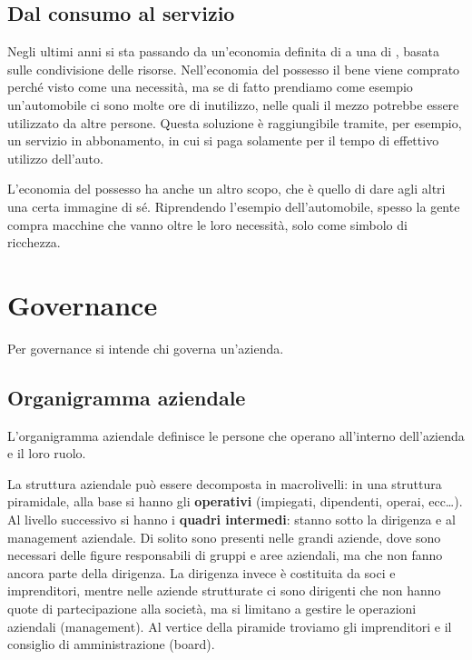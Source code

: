 \section{Dal consumo al servizio} 

Negli ultimi anni si sta passando da un'economia definita di 
 a una di , basata sulle condivisione 
delle risorse.
Nell'economia del possesso il bene viene comprato perché visto come una
necessità, ma se di fatto prendiamo come esempio un'automobile ci sono molte ore
di inutilizzo, nelle quali il mezzo potrebbe essere utilizzato da altre persone.
Questa soluzione è raggiungibile tramite, per esempio, un servizio in
abbonamento, in cui si paga solamente per il tempo di effettivo utilizzo
dell'auto.

L'economia del possesso ha anche un altro scopo, che è quello di dare agli altri
una certa immagine di sé. Riprendendo l'esempio dell'automobile, spesso la gente
compra macchine che vanno oltre le loro necessità, solo come simbolo di
ricchezza.


\chapter{Governance}

Per governance si intende chi governa un'azienda.

\section{Organigramma aziendale}
\begin{definition}
L'organigramma aziendale definisce le persone che operano all'interno
dell'azienda e il loro ruolo.
\end{definition}

\noindent La struttura aziendale può essere decomposta in macrolivelli: in una
struttura piramidale, alla base si hanno gli \textbf{operativi} (impiegati,
dipendenti, operai, ecc\dots). Al livello successivo si hanno i \textbf{quadri
intermedi}: stanno sotto la dirigenza e al management aziendale. Di solito sono
presenti nelle grandi aziende, dove sono necessari delle figure responsabili di
gruppi e aree aziendali, ma che non fanno ancora parte della dirigenza. La
dirigenza invece è costituita da soci e imprenditori, mentre nelle aziende
strutturate ci sono dirigenti che non hanno quote di partecipazione alla
società, ma si limitano a gestire le operazioni aziendali (management). Al
vertice della piramide troviamo gli imprenditori e il consiglio di
amministrazione (board).

